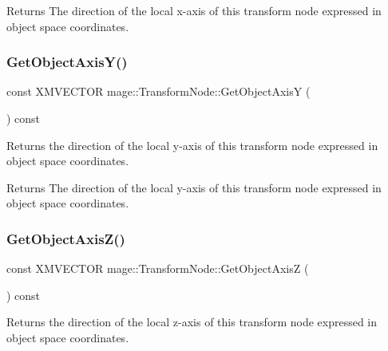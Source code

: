 \begin{DoxyReturn}{Returns}
The direction of the local x-\/axis of this transform node expressed in object space coordinates. 
\end{DoxyReturn}
\hypertarget{structmage_1_1_transform_node_ad595911b6df1898a49263eb8e201d00c}{}\label{structmage_1_1_transform_node_ad595911b6df1898a49263eb8e201d00c} 
\subsubsection{\texorpdfstring{Get\+Object\+Axis\+Y()}{GetObjectAxisY()}}
{\footnotesize\ttfamily const X\+M\+V\+E\+C\+T\+OR mage\+::\+Transform\+Node\+::\+Get\+Object\+AxisY (\begin{DoxyParamCaption}{ }\end{DoxyParamCaption}) const\hspace{0.3cm}{\ttfamily [noexcept]}}

Returns the direction of the local y-\/axis of this transform node expressed in object space coordinates.

\begin{DoxyReturn}{Returns}
The direction of the local y-\/axis of this transform node expressed in object space coordinates. 
\end{DoxyReturn}
\hypertarget{structmage_1_1_transform_node_a12e14a4d519295d6d1fb2b839061ef20}{}\label{structmage_1_1_transform_node_a12e14a4d519295d6d1fb2b839061ef20} 
\subsubsection{\texorpdfstring{Get\+Object\+Axis\+Z()}{GetObjectAxisZ()}}
{\footnotesize\ttfamily const X\+M\+V\+E\+C\+T\+OR mage\+::\+Transform\+Node\+::\+Get\+Object\+AxisZ (\begin{DoxyParamCaption}{ }\end{DoxyParamCaption}) const\hspace{0.3cm}{\ttfamily [noexcept]}}

Returns the direction of the local z-\/axis of this transform node expressed in object space coordinates.

